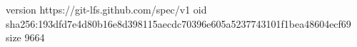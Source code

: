 version https://git-lfs.github.com/spec/v1
oid sha256:193dfd7e4d80b16e8d398115aecdc70396e605a5237743101f1bea48604ecf69
size 9664
